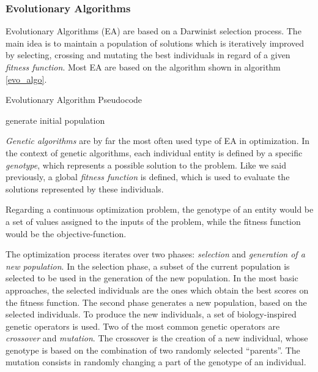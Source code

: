 \subsubsection{Evolutionary Algorithms}

Evolutionary Algorithms (EA) are based on a Darwinist selection process. The main idea is to maintain a population of solutions which is iteratively improved by selecting, crossing and mutating the best individuals in regard of a given \emph{fitness function}. Most EA are based on the algorithm shown in algorithm \ref{evo_algo}.

\begin{algorithm}
\caption{Evolutionary Algorithm Pseudocode}
\label{evo_algo}

	generate initial population\;
\end{algorithm}

\emph{Genetic algorithms} \cite{holland1992adaptation} are by far the most often used type of EA in optimization. In the context of genetic algorithms, each individual entity is defined by a specific \emph{genotype}, which represents a possible solution to the problem.
Like we said previously, a global \emph{fitness function} is defined, which is used to evaluate the solutions represented by these individuals.

Regarding a continuous optimization problem, the genotype of an entity would be a set of values assigned to the inputs of the problem, while the fitness function would be the objective-function.

The optimization process iterates over two phases: \emph{selection} and \emph{generation of a new population}.
In the selection phase, a subset of the current population is selected to be used in the generation of the new population. In the most basic approaches, the selected individuals are the ones which obtain the best scores on the fitness function.
The second phase generates a new population, based on the selected individuals. To produce the new individuals, a set of biology-inspired genetic operators is used. Two of the most common genetic operators are \emph{crossover} and \emph{mutation}. The crossover is the creation of a new individual, whose genotype is based on the combination of two randomly selected \enquote{parents}. The mutation consists in randomly changing a part of the genotype of an individual.

